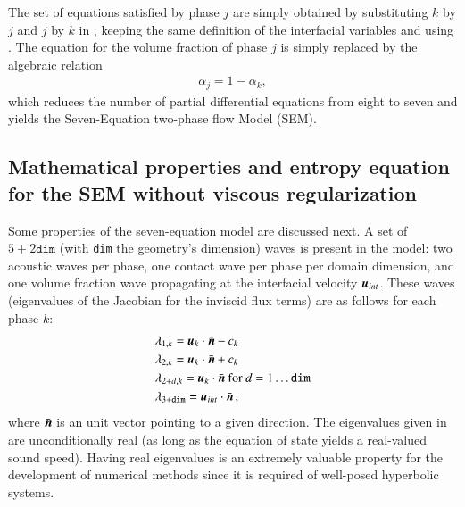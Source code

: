 \documentclass[preprint,10pt]{elsarticle}
\begin{document}

The set of equations satisfied by phase $j$ are simply obtained by substituting $k$ by $j$ and $j$ by $k$ in , keeping the same definition of the interfacial variables and using . The equation for the volume fraction of phase $j$ is simply replaced by the algebraic relation
%
\begin{align}
 \alpha_{j}= 1 - \alpha_{k}, \nonumber
\end{align}
%
which reduces the number of partial differential equations from eight to seven and yields the Seven-Equation two-phase flow Model (SEM). 

\subsection{Mathematical properties and entropy equation for the SEM without viscous regularization}\label{eq:sem-ent-wv}
Some properties of the seven-equation model are discussed next. A set of $5+2\texttt{dim}$ (with \texttt{dim} the geometry's dimension) waves is present in the model: two acoustic waves per phase, one contact wave per phase per domain dimension, and one volume fraction wave propagating at the interfacial velocity $\boldsymbol u_{int}$. These waves (eigenvalues of the Jacobian for the inviscid flux terms) are as follows for each phase $k$:
% 
\begin{align}\label{eq:eigenvalues}
&\lambda_{1,k} = \boldsymbol u_k \cdot \bar{\boldsymbol n} - c_k \nonumber\\
&\lambda_{2,k} = \boldsymbol u_k \cdot \bar{\boldsymbol n} + c_k \nonumber\\
&\lambda_{2+d,k} = \boldsymbol u_k \cdot \bar{\boldsymbol n} \text{ for } d = 1 \dots \texttt{dim} \\
&\lambda_{3+\texttt{dim}} = \boldsymbol u_{int} \cdot \bar{\boldsymbol n} \nonumber \,,
\end{align}
%
where $\bar{\boldsymbol n}$ is an unit vector pointing to a given direction. The eigenvalues given in  are unconditionally real (as long as the equation of state yields a real-valued sound speed). Having real eigenvalues is an extremely valuable property for the development of numerical methods since it is required of well-posed hyperbolic systems. 
\end{document}
